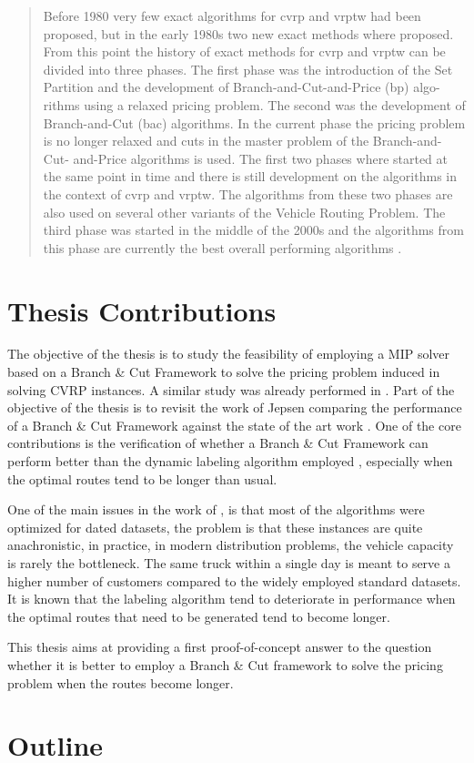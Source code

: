 \begin{quote}
	Before 1980 very few exact algorithms for cvrp and vrptw had been
	proposed, but in the early 1980s two new exact methods where proposed.
	From this point the history of exact methods for cvrp and vrptw can
	be divided into three phases. The first phase was the introduction of the
	Set Partition and the development of Branch-and-Cut-and-Price (bp) algo-
	rithms using a relaxed pricing problem. The second was the development of
	Branch-and-Cut (bac) algorithms. In the current phase the pricing problem
	is no longer relaxed and cuts in the master problem of the Branch-and-Cut-
	and-Price algorithms is used. The first two phases where started at the same
	point in time and there is still development on the algorithms in the context
	of cvrp and vrptw. The algorithms from these two phases are also used
	on several other variants of the Vehicle Routing Problem. The third phase
	was started in the middle of the 2000s and the algorithms from this phase
	are currently the best overall performing algorithms \cite{jepsen_branch-and-cut_2011}.
\end{quote}

\section{Thesis Contributions}
The objective of the thesis is to study the feasibility of employing a MIP solver
based on a Branch \& Cut Framework to solve the pricing problem induced in solving
CVRP instances.
A similar study was already performed in \cite{Jepsen2014}.
Part of the objective of the thesis is to revisit the work of Jepsen comparing
the performance of a Branch \& Cut Framework against the state of the art work
\cite{pessoa2020generic}.
One of the core contributions is the verification of whether a Branch \& Cut Framework
can perform better than the dynamic labeling algorithm employed \cite{pessoa2020generic},
especially when the optimal routes tend to be longer than usual.

One of the main issues in the work of \cite{pessoa2020generic}, is that
most of the algorithms were optimized for dated datasets, the problem
is that these instances are quite anachronistic, in practice, in modern
distribution problems, the vehicle capacity is rarely the bottleneck.
The same truck within a single day is meant to serve a higher number of customers
compared to the widely employed standard datasets.
It is known that the labeling algorithm tend to deteriorate in performance when
the optimal routes that need to be generated tend to become longer.

This thesis aims at providing a first proof-of-concept answer to the question
whether it is better to employ a Branch \& Cut framework to solve the pricing problem
when the routes become longer.


\section{Outline}
